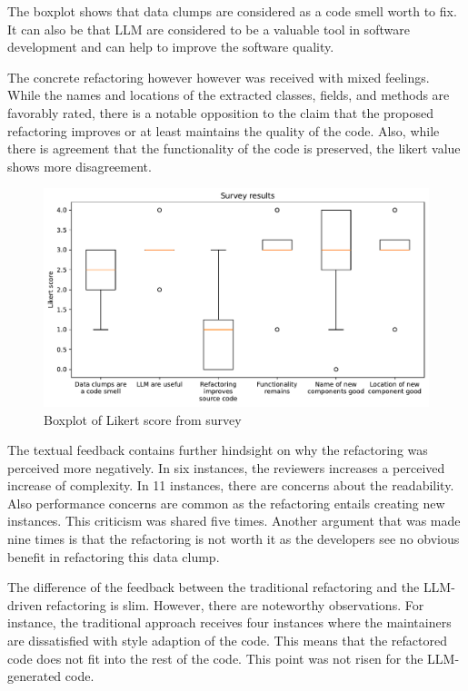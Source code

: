The boxplot shows that data clumps are considered as a code smell worth to fix. It can also be that \ac{LLM} are considered to be a valuable tool in software development and can help to improve the software quality.

The concrete refactoring however however was received with mixed feelings. While the names and locations of the extracted classes, fields, and methods are favorably rated, there is a notable opposition to the claim that the proposed refactoring improves or at least maintains the quality of the code. Also, while there is agreement that the functionality of the code is preserved, the likert value shows more disagreement.

\begin{figure}
    \centering
    \includegraphics[width=\columnwidth]{figures/chapter5/survey_results.pdf}
    \caption{Boxplot of Likert score from survey}
    \label{fig:boxplot_survey}
\end{figure}


The textual feedback contains further hindsight on why the refactoring was perceived more negatively. In six instances, the reviewers increases a perceived increase of complexity. In 11 instances, there are concerns about the readability. Also performance concerns are common as the refactoring entails creating new instances. This criticism was shared five times. Another argument that was made nine times is that the refactoring is not worth it as the developers see no obvious benefit in refactoring this data clump.

The difference of the feedback between the traditional refactoring and the \ac{LLM}-driven refactoring is slim. However, there are noteworthy observations. For instance, the traditional approach receives four instances where the maintainers are dissatisfied with style adaption of  the code. This means that the refactored code does not fit into the rest of the code. This point was not risen for the \ac{LLM}-generated code. 

